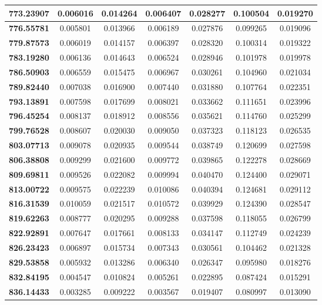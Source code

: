 \documentclass[10pt, a4paper]{article}
\begin{document}
\begin{appendices}
\begin{longtable}{|c|c|c|c|c|c|c|}
\textbf{773.23907} & 0.006016 & 0.014264 & 0.006407 & 0.028277 & 0.100504 & 0.019270 \\ \hline
\textbf{776.55781} & 0.005801 & 0.013966 & 0.006189 & 0.027876 & 0.099265 & 0.019096 \\ \hline
\textbf{779.87573} & 0.006019 & 0.014157 & 0.006397 & 0.028320 & 0.100314 & 0.019322 \\ \hline
\textbf{783.19280} & 0.006136 & 0.014643 & 0.006524 & 0.028946 & 0.101978 & 0.019978 \\ \hline
\textbf{786.50903} & 0.006559 & 0.015475 & 0.006967 & 0.030261 & 0.104960 & 0.021034 \\ \hline
\textbf{789.82440} & 0.007038 & 0.016900 & 0.007440 & 0.031880 & 0.107764 & 0.022351 \\ \hline
\textbf{793.13891} & 0.007598 & 0.017699 & 0.008021 & 0.033662 & 0.111651 & 0.023996 \\ \hline
\textbf{796.45254} & 0.008137 & 0.018912 & 0.008556 & 0.035621 & 0.114760 & 0.025299 \\ \hline
\textbf{799.76528} & 0.008607 & 0.020030 & 0.009050 & 0.037323 & 0.118123 & 0.026535 \\ \hline
\textbf{803.07713} & 0.009078 & 0.020935 & 0.009544 & 0.038749 & 0.120699 & 0.027598 \\ \hline
\textbf{806.38808} & 0.009299 & 0.021600 & 0.009772 & 0.039865 & 0.122278 & 0.028669 \\ \hline
\textbf{809.69811} & 0.009526 & 0.022082 & 0.009994 & 0.040470 & 0.124400 & 0.029071 \\ \hline
\textbf{813.00722} & 0.009575 & 0.022239 & 0.010086 & 0.040394 & 0.124681 & 0.029112 \\ \hline
\textbf{816.31539} & 0.010059 & 0.021517 & 0.010572 & 0.039929 & 0.124390 & 0.028547 \\ \hline
\textbf{819.62263} & 0.008777 & 0.020295 & 0.009288 & 0.037598 & 0.118055 & 0.026799 \\ \hline
\textbf{822.92891} & 0.007647 & 0.017661 & 0.008133 & 0.034147 & 0.112749 & 0.024239 \\ \hline
\textbf{826.23423} & 0.006897 & 0.015734 & 0.007343 & 0.030561 & 0.104462 & 0.021328 \\ \hline
\textbf{829.53858} & 0.005932 & 0.013286 & 0.006340 & 0.026347 & 0.095980 & 0.018276 \\ \hline
\textbf{832.84195} & 0.004547 & 0.010824 & 0.005261 & 0.022895 & 0.087424 & 0.015291 \\ \hline
\textbf{836.14433} & 0.003285 & 0.009222 & 0.003567 & 0.019407 & 0.080997 & 0.013090 \\ \hline

\end{longtable}
\end{appendices}
\end{document}

